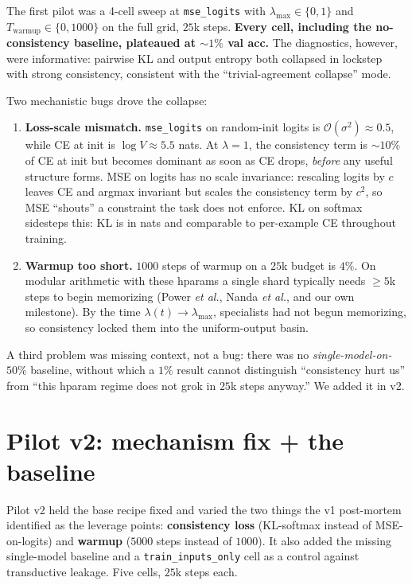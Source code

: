 \documentclass[11pt,a4paper]{article}
\begin{document}
The first pilot was a 4-cell sweep at \texttt{mse\_logits} with
$\lambda_\text{max} \in \{0, 1\}$ and
$T_\text{warmup} \in \{0, 1000\}$ on the full grid, $25$k steps.
\textbf{Every cell, including the no-consistency baseline, plateaued
at $\sim$$1\%$ val acc.} The diagnostics, however, were informative:
pairwise KL and output entropy both collapsed in lockstep with strong
consistency, consistent with the ``trivial-agreement collapse'' mode.

Two mechanistic bugs drove the collapse:
\begin{enumerate}[leftmargin=*,itemsep=2pt]
  \item \textbf{Loss-scale mismatch.} \texttt{mse\_logits} on
        random-init logits is $\mathcal{O}(\sigma^2) \approx 0.5$,
        while CE at init is $\log V \approx 5.5$ nats. At
        $\lambda{=}1$, the consistency term is $\sim$$10\%$ of CE at
        init but becomes dominant as soon as CE drops, \emph{before}
        any useful structure forms. MSE on logits has no scale
        invariance: rescaling logits by $c$ leaves CE and argmax
        invariant but scales the consistency term by $c^2$, so MSE
        ``shouts'' a constraint the task does not enforce. KL on
        softmax sidesteps this: KL is in nats and comparable to
        per-example CE throughout training.
  \item \textbf{Warmup too short.} $1000$ steps of warmup on a $25$k
        budget is $4\%$. On modular arithmetic with these hparams a
        single shard typically needs $\geq 5$k steps to begin
        memorizing (Power \textit{et al.}, Nanda \textit{et al.}, and
        our own milestone). By the time $\lambda(t) \to
        \lambda_\text{max}$, specialists had not begun memorizing, so
        consistency locked them into the uniform-output basin.
\end{enumerate}
A third problem was missing context, not a bug: there was no
\emph{single-model-on-$50\%$} baseline, without which a $1\%$ result
cannot distinguish ``consistency hurt us'' from ``this hparam regime
does not grok in $25$k steps anyway.'' We added it in v2.

\section{Pilot v2: mechanism fix + the baseline}
\label{sec:v2}

Pilot v2 held the base recipe fixed and varied the two things the v1
post-mortem identified as the leverage points: \textbf{consistency
loss} (KL-softmax instead of MSE-on-logits) and \textbf{warmup}
($5000$ steps instead of $1000$). It also added the missing single-model
baseline and a \texttt{train\_inputs\_only} cell as a control against
transductive leakage. Five cells, $25$k steps each.
\end{document}
